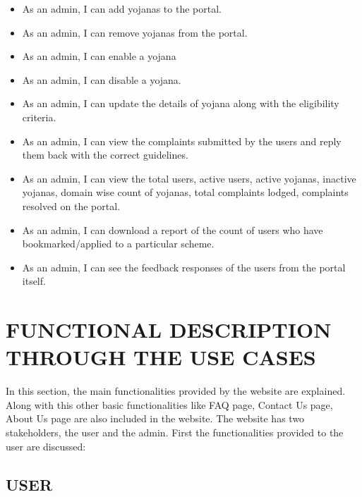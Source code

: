 \documentclass[conference]{IEEEtran}
\begin{document}
\begin{itemize}
    \item As an admin, I can add yojanas to the portal.
    \item As an admin, I can remove yojanas from the portal.
     \item As an admin, I can enable a yojana
    \item As an admin, I can disable a yojana.
    \item As an admin, I can update the details of yojana along with the eligibility criteria.
    \item As an admin, I can view the complaints submitted by the users and reply them back with the correct guidelines.
    \item As an admin, I can view the total users, active users, active yojanas, inactive yojanas, domain wise count of yojanas, total complaints lodged, complaints resolved on the portal.
    \item As an admin, I can download a report of the count of users who have bookmarked/applied to a particular scheme.
    \item As an admin, I can see the feedback responses of the users from the portal itself.
    

\end{itemize}
\section{FUNCTIONAL DESCRIPTION THROUGH THE USE CASES}
In this section, the main functionalities provided by the website are explained. Along with this other basic functionalities like FAQ page, Contact Us page, About Us page are also included in the website. The website has two stakeholders, the user and the admin. First the functionalities provided to the user are discussed:\\
\subsection{USER}
\end{document}
